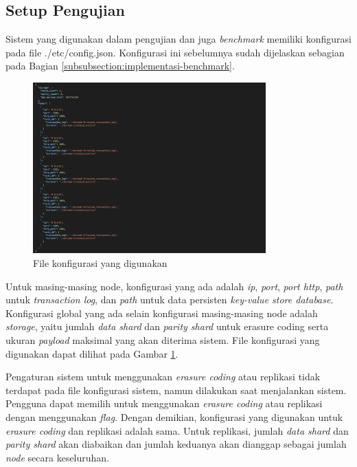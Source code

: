 \subsection{Setup Pengujian}
\label{subsection:setup-pengujian}

Sistem yang digunakan dalam pengujian dan juga \textit{benchmark} memiliki konfigurasi pada file ./etc/config.json. Konfigurasi ini sebelumnya sudah dijelaskan sebagian pada Bagian \ref{subsubsection:implementasi-benchmark}.

\begin{figure}[ht]
	\centering
	\includegraphics[width=0.80\textwidth]{resources/chapter-4/konfigurasi.png}
	\caption{File konfigurasi yang digunakan}
	\label{fig:config-json}
\end{figure}

Untuk masing-masing node, konfigurasi yang ada adalah \textit{ip}, \textit{port}, \textit{port http}, \textit{path} untuk \textit{transaction log}, dan \textit{path} untuk data persisten \textit{key-value store database}. Konfigurasi global yang ada selain konfigurasi masing-masing node adalah \textit{storage}, yaitu jumlah \textit{data shard} dan \textit{parity shard} untuk erasure coding serta ukuran \textit{payload} maksimal yang akan diterima sistem. File konfigurasi yang digunakan dapat dilihat pada Gambar \ref{fig:config-json}.

Pengaturan sistem untuk menggunakan \textit{erasure coding} atau replikasi tidak terdapat pada file konfigurasi sistem, namun dilakukan saat menjalankan sistem. Pengguna dapat memilih untuk menggunakan \textit{erasure coding} atau
replikasi dengan menggunakan \textit{flag}. Dengan demikian, konfigurasi yang digunakan untuk \textit{erasure coding} dan replikasi adalah sama. Untuk replikasi, jumlah \textit{data shard} dan \textit{parity shard} akan diabaikan dan jumlah keduanya akan dianggap sebagai jumlah \textit{node} secara keseluruhan.

